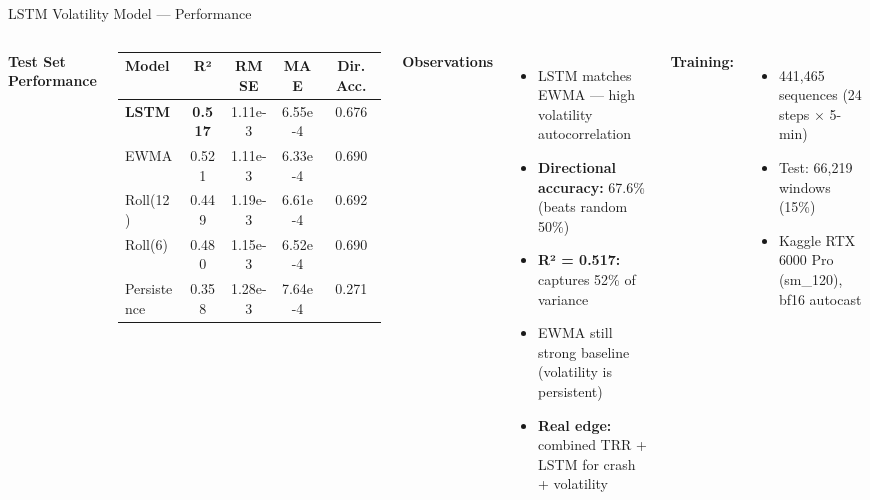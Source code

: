 \documentclass[10pt,aspectratio=169]{beamer}
\begin{document}
\begin{frame}{LSTM Volatility Model — Performance}
  \begin{columns}[t]
    \textbf{Test Set Performance}
    \begin{table}
      \centering
      \footnotesize
      \begin{tabular}{lcccc}
        \toprule
        Model & R² & RMSE & MAE & Dir. Acc. \\
        \midrule
        \textbf{LSTM} & \textbf{0.517} & 1.11e-3 & 6.55e-4 & 0.676 \\
        EWMA & 0.521 & 1.11e-3 & 6.33e-4 & 0.690 \\
        Roll(12) & 0.449 & 1.19e-3 & 6.61e-4 & 0.692 \\
        Roll(6) & 0.480 & 1.15e-3 & 6.52e-4 & 0.690 \\
        Persistence & 0.358 & 1.28e-3 & 7.64e-4 & 0.271 \\
        \bottomrule
      \end{tabular}
    \end{table}
    \textbf{Observations}
    \begin{itemize}
      \item LSTM matches EWMA — high volatility autocorrelation
      \item \textbf{Directional accuracy:} 67.6\% (beats random 50\%)
      \item \textbf{R² = 0.517:} captures 52\% of variance
      \item EWMA still strong baseline (volatility is persistent)
      \item \textbf{Real edge:} combined TRR + LSTM for crash + volatility
    \end{itemize}
    \vspace{0.3cm}
    \textbf{Training:}
    \begin{itemize}
      \item 441,465 sequences (24 steps $\times$ 5-min)
      \item Test: 66,219 windows (15\%)
      \item Kaggle RTX 6000 Pro (sm\_120), bf16 autocast
    \end{itemize}
  \end{columns}
\end{frame}

\end{document}

